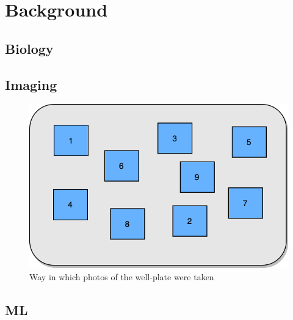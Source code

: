 \section{Background}
\subsection{Biology}
\subsection{Imaging}

\begin{figure}[htb]
	\begin{center}
		\includegraphics[width=0.5\linewidth]{bilder/dic-random.png}
		\caption{Way in which photos of the well-plate were taken}\label{fig:random-dic}
	\end{center}
\end{figure}

\subsection{ML}